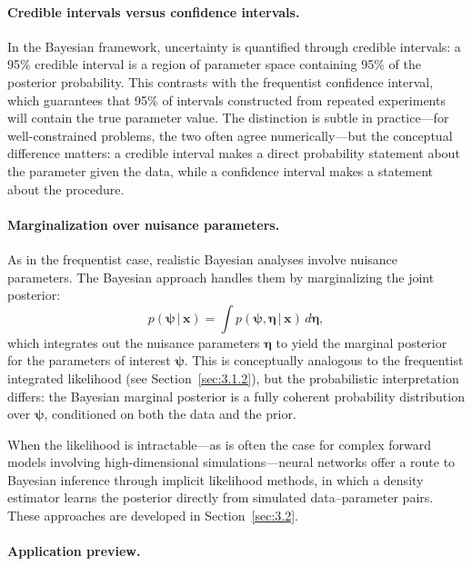 \paragraph{Credible intervals versus confidence intervals.}

In the Bayesian framework, uncertainty is quantified through credible intervals: a 95\% credible interval is a region of parameter space containing 95\% of the posterior probability.
This contrasts with the frequentist confidence interval, which guarantees that 95\% of intervals constructed from repeated experiments will contain the true parameter value.
The distinction is subtle in practice---for well-constrained problems, the two often agree numerically---but the conceptual difference matters: a credible interval makes a direct probability statement about the parameter given the data, while a confidence interval makes a statement about the procedure.

\paragraph{Marginalization over nuisance parameters.}

As in the frequentist case, realistic Bayesian analyses involve nuisance parameters.
The Bayesian approach handles them by marginalizing the joint posterior:
\begin{equation}
	p(\boldsymbol{\psi} \,|\, \mathbf{x}) = \int p(\boldsymbol{\psi}, \boldsymbol{\eta} \,|\, \mathbf{x}) \, d\boldsymbol{\eta},
	\label{eq:bayesian_marginalization}
\end{equation}
which integrates out the nuisance parameters $\boldsymbol{\eta}$ to yield the marginal posterior for the parameters of interest $\boldsymbol{\psi}$.
This is conceptually analogous to the frequentist integrated likelihood (see Section~\ref{sec:3.1.2}), but the probabilistic interpretation differs: the Bayesian marginal posterior is a fully coherent probability distribution over $\boldsymbol{\psi}$, conditioned on both the data and the prior.

When the likelihood is intractable---as is often the case for complex forward models involving high-dimensional simulations---neural networks offer a route to Bayesian inference through implicit likelihood methods, in which a density estimator learns the posterior directly from simulated data--parameter pairs.
These approaches are developed in Section~\ref{sec:3.2}.

\paragraph{Application preview.}

